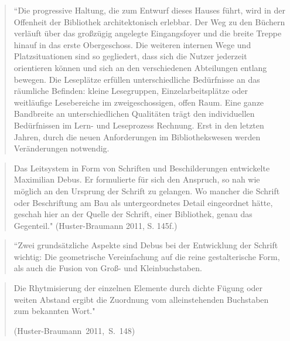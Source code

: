 \documentclass[a4paper,
fontsize=11pt,
oneside,
numbers=noperiodatend,
parskip=half-,
bibliography=totoc,
final
]{scrartcl}
\begin{document}
\begin{quote}
``Die progressive Haltung, die zum Entwurf dieses Hauses führt, wird in
der Offenheit der Bibliothek architektonisch erlebbar. Der Weg zu den
Büchern verläuft über das großzügig angelegte Eingangsfoyer und die
breite Treppe hinauf in das erste Obergeschoss. Die weiteren internen
Wege und Platzsituationen sind so gegliedert, dass sich die Nutzer
jederzeit orientieren können und sich an den verschiedenen Abteilungen
entlang bewegen. Die Leseplätze erfüllen unterschiedliche Bedürfnisse an
das räumliche Befinden: kleine Lesegruppen, Einzelarbeitsplätze oder
weitläufige Lesebereiche im zweigeschossigen, offen Raum. Eine ganze
Bandbreite an unterschiedlichen Qualitäten trägt den individuellen
Bedürfnissen im Lern- und Leseprozess Rechnung. Erst in den letzten
Jahren, durch die neuen Anforderungen im Bibliothekswesen werden
Veränderungen notwendig.
\end{quote}

\begin{quote}
Das Leitsystem in Form von Schriften und Beschilderungen entwickelte
Maximilian Debus. Er formulierte für sich den Anspruch, so nah wie
möglich an den Ursprung der Schrift zu gelangen. Wo mancher die Schrift
oder Beschriftung am Bau als untergeordnetes Detail eingeordnet hätte,
geschah hier an der Quelle der Schrift, einer Bibliothek, genau das
Gegenteil." (Huster-Braumann 2011, S. 145f.)
\end{quote}

\begin{quote}
``Zwei grundsätzliche Aspekte sind Debus bei der Entwicklung der Schrift
wichtig: Die geometrische Vereinfachung auf die reine gestalterische
Form, als auch die Fusion von Groß- und Kleinbuchstaben.
\end{quote}

\begin{quote}
Die Rhytmisierung der einzelnen Elemente durch dichte Fügung oder weiten
Abstand ergibt die Zuordnung vom alleinstehenden Buchstaben zum
bekannten Wort." 

\mbox{(Huster-Braumann 2011, S. 148)}
\end{quote}
\end{document}
